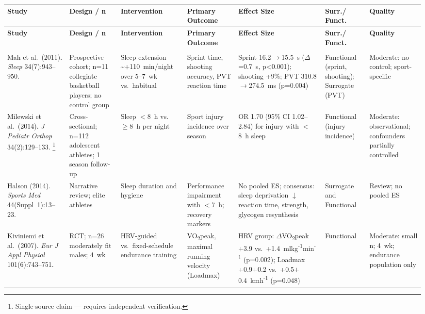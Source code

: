 \begin{center}
\scriptsize
\setlength{\tabcolsep}{1pt}
\begin{longtable}{@{}>{\raggedright}p{3.0cm} >{\raggedright}p{3cm} >{\raggedright}p{2.5cm} >{\raggedright}p{2.5cm} >{\raggedright}p{2.5cm} >{\raggedright}p{1.6cm} >{\raggedright\arraybackslash}p{1.8cm}@{}}
\toprule
\textbf{Study} & \textbf{Design / n} & \textbf{Intervention} & \textbf{Primary Outcome} & \textbf{Effect Size} & \textbf{Surr./ Funct.} & \textbf{Quality} \\
\midrule
\endfirsthead
\toprule
\textbf{Study} & \textbf{Design / n} & \textbf{Intervention} & \textbf{Primary Outcome} & \textbf{Effect Size} & \textbf{Surr./ Funct.} & \textbf{Quality} \\
\midrule
\endhead
\midrule
\multicolumn{7}{r}{\footnotesize\textit{Continued on next page}}\\
\endfoot
\bottomrule
\endlastfoot

Mah et al.\ (2011). \emph{Sleep} 34(7):943--950. \cite{MMKD11}
& Prospective cohort; n=11 collegiate basketball players; no control group
& Sleep extension \textasciitilde{}+110~min/night over 5--7~wk vs.\ habitual
& Sprint time, shooting accuracy, PVT reaction time
& Sprint 16.2$\to$15.5~s ($\Delta$=0.7~s, p<0.001); shooting +9\%; PVT 310.8$\to$274.5~ms (p=0.004)
& Functional (sprint, shooting); Surrogate (PVT)
& Moderate: no control; sport-specific \\

Milewski et al.\ (2014). \emph{J Pediatr Orthop} 34(2):129--133. \cite{MSBE14}\footnote{Single-source claim --- requires independent verification.}
& Cross-sectional; n=112 adolescent athletes; 1 season follow-up
& Sleep $<$8~h vs.\ $\geq$8~h per night
& Sport injury incidence over season
& OR 1.70 (95\% CI 1.02--2.84) for injury with $<$8~h sleep
& Functional (injury incidence)
& Moderate: observational; confounders partially controlled \\

Halson (2014). \emph{Sports Med} 44(Suppl~1):13--23. \cite{HAL14}
& Narrative review; elite athletes
& Sleep duration and hygiene
& Performance impairment with $<$7~h; recovery markers
& No pooled ES; consensus: sleep deprivation $\downarrow$ reaction time, strength, glycogen resynthesis
& Surrogate and Functional
& Review; no pooled ES \\

Kiviniemi et al.\ (2007). \emph{Eur J Appl Physiol} 101(6):743--751. \cite{KHKT07}
& RCT; n=26 moderately fit males; 4~wk
& HRV-guided vs.\ fixed-schedule endurance training
& VO\textsubscript{2}peak, maximal running velocity (Loadmax)
& HRV group: $\Delta$VO\textsubscript{2}peak +3.9 vs.\ +1.4~ml\textperiodcentered{}kg\textsuperscript{-1}\textperiodcentered{}min\textsuperscript{-1} (p=0.002); Loadmax +0.9$\pm$0.2 vs.\ +0.5$\pm$0.4~km\textperiodcentered{}h\textsuperscript{-1} (p=0.048)
& Functional
& Moderate: small n; 4~wk; endurance population only \\


\end{longtable}
\end{center}
